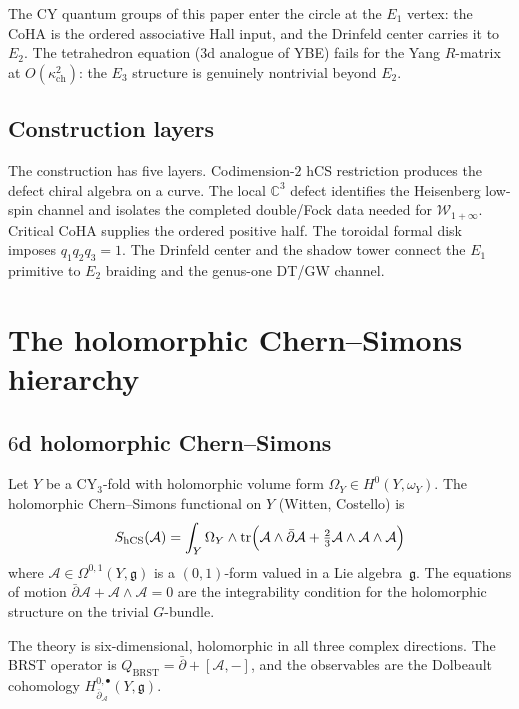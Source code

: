 \documentclass[11pt]{article}
\theoremstyle{plain}
\theoremstyle{definition}
\theoremstyle{remark}
\newcommand{\fg}{\mathfrak{g}}
\newcommand{\cA}{\mathcal{A}}
\newcommand{\cW}{\mathcal{W}}
\newcommand{\bC}{\mathbb{C}}
\newcommand{\Eone}{E_1}
\newcommand{\Etwo}{E_2}
\newcommand{\Ethree}{E_3}
\newcommand{\hCS}{\mathrm{hCS}}
\newcommand{\BRST}{\mathrm{BRST}}
\begin{document}
The CY quantum groups of this paper enter the circle at the
$\Eone$ vertex: the CoHA is the ordered associative Hall input, and the
Drinfeld center carries it to $\Etwo$.  The tetrahedron equation
(3d analogue of YBE) fails for the Yang $R$-matrix at
$O(\kappa_{\mathrm{ch}}^2)$: the $\Ethree$ structure is
genuinely nontrivial beyond $\Etwo$.

\subsection{Construction layers}

The construction has five layers.  Codimension-$2$ hCS restriction
produces the defect chiral algebra on a curve.  The local $\bC^3$
defect identifies the Heisenberg low-spin channel and isolates the
completed double/Fock data needed for $\cW_{1+\infty}$.  Critical
CoHA supplies the ordered positive half.  The toroidal formal disk
imposes $q_1q_2q_3=1$.  The Drinfeld center and the shadow tower
connect the $\Eone$ primitive to $\Etwo$ braiding and the genus-one
DT/GW channel.



\section{The holomorphic Chern--Simons hierarchy}
\label{sec:hcs-hierarchy}

\subsection{$6$d holomorphic Chern--Simons}

Let $Y$ be a CY$_3$-fold with holomorphic volume form
$\Omega_Y \in H^0(Y, \omega_Y)$.  The holomorphic Chern--Simons
functional on $Y$ (Witten, Costello) is
\[
 S_{\hCS}(\cA)
 = \int_Y \Omega_Y \wedge
 \mathrm{tr}\Bigl(\cA \wedge \bar\partial \cA
 + \tfrac{2}{3}\cA \wedge \cA \wedge \cA\Bigr)
\]
where $\cA \in \Omega^{0,1}(Y, \fg)$ is a $(0,1)$-form valued in
a Lie algebra~$\fg$.  The equations of motion
$\bar\partial \cA + \cA \wedge \cA = 0$ are the integrability
condition for the holomorphic structure on the trivial $G$-bundle.

The theory is six-dimensional, holomorphic in all three complex
directions.  The BRST operator is $Q_{\BRST} = \bar\partial +
[\cA, -]$, and the observables are the Dolbeault cohomology
$H^{0,\bullet}_{\bar\partial_\cA}(Y, \fg)$.
\end{document}
